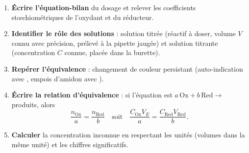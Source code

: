 \documentclass[11pt]{article}
\newcommand{\cle}[1]{{\popxbold\color{popdark}#1}}
\begin{document}
\begin{methode}
\begin{enumerate}
\item \textbf{Écrire l'équation-bilan} du dosage et relever les coefficients stœchiométriques de l'oxydant et du réducteur.
\item \textbf{Identifier le rôle des solutions} : solution \cle{titrée} (réactif à doser, volume $V$ connu avec précision, prélevé à la \cle{pipette jaugée}) et solution \cle{titrante} (concentration $C$ connue, placée dans la \cle{burette}).
\item \textbf{Repérer l'équivalence} : changement de couleur persistant (\cle{auto-indication} avec , empois d'amidon avec ).
\item \textbf{Écrire la relation d'équivalence} : si l'équation est $a\,\mathrm{Ox} + b\,\mathrm{Red} \rightarrow$ produits, alors
\[
\frac{n_{\mathrm{Ox}}}{a}=\frac{n_{\mathrm{Red}}}{b} \quad \text{soit} \quad \frac{C_{\mathrm{Ox}}V_{E}}{a}=\frac{C_{\mathrm{Red}}V_{\mathrm{Red}}}{b}.
\]
\item \textbf{Calculer} la concentration inconnue en respectant les unités (volumes dans la même unité) et les \cle{chiffres significatifs}.
\end{enumerate}
\end{methode}
\end{document}
